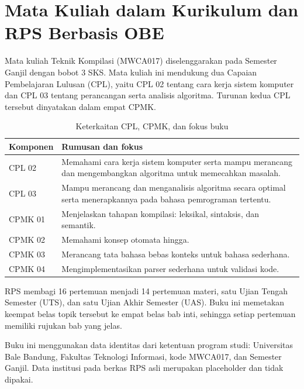 \section{Mata Kuliah dalam Kurikulum dan RPS Berbasis OBE}
\label{sec:ch01-kurikulum}

Mata kuliah Teknik Kompilasi (MWCA017) diselenggarakan pada Semester
Ganjil dengan bobot 3 SKS. Mata kuliah ini mendukung dua Capaian
Pembelajaran Lulusan (CPL), yaitu CPL 02 tentang cara kerja sistem
komputer dan CPL 03 tentang perancangan serta analisis algoritma.
Turunan kedua CPL tersebut dinyatakan dalam empat CPMK.

\begin{table}[H]
\centering
\caption{Keterkaitan CPL, CPMK, dan fokus buku}
\label{tab:ch01-cpl-cpmk}
\begin{tabularx}{\textwidth}{@{}lX@{}}
\toprule
\textbf{Komponen} & \textbf{Rumusan dan fokus} \\
\midrule
CPL 02 & Memahami cara kerja sistem komputer serta mampu merancang
dan mengembangkan algoritma untuk memecahkan masalah. \\
CPL 03 & Mampu merancang dan menganalisis algoritma secara optimal
serta menerapkannya pada bahasa pemrograman tertentu. \\
\midrule
CPMK 01 & Menjelaskan tahapan kompilasi: leksikal, sintaksis, dan
semantik. \\
CPMK 02 & Memahami konsep otomata hingga. \\
CPMK 03 & Merancang tata bahasa bebas konteks untuk bahasa sederhana. \\
CPMK 04 & Mengimplementasikan parser sederhana untuk validasi kode. \\
\bottomrule
\end{tabularx}
\end{table}

RPS membagi 16 pertemuan menjadi 14 pertemuan materi, satu Ujian Tengah
Semester (UTS), dan satu Ujian Akhir Semester (UAS). Buku ini memetakan
keempat belas topik tersebut ke empat belas bab inti, sehingga setiap
pertemuan memiliki rujukan bab yang jelas.

\begin{warningbox}
Buku ini menggunakan data identitas dari ketentuan program studi:
Universitas Bale Bandung, Fakultas Teknologi Informasi, kode MWCA017,
dan Semester Ganjil. Data institusi pada berkas RPS asli merupakan
placeholder dan tidak dipakai.
\end{warningbox}
